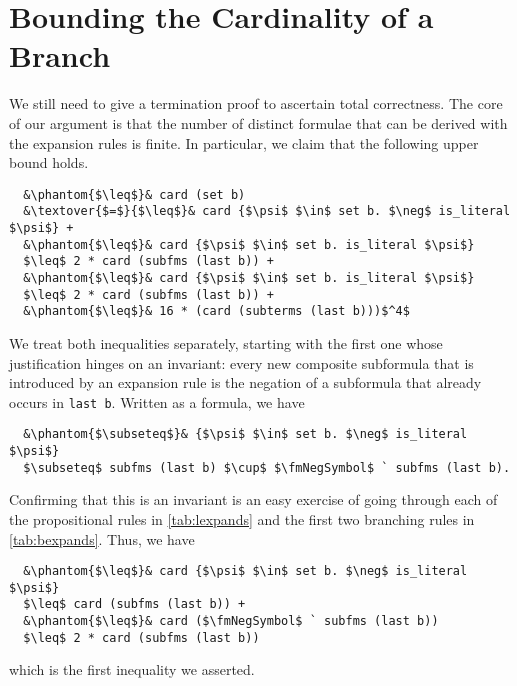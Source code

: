 \documentclass[sigplan,10pt,anonymous,review]{acmart}
\newcommand{\textover}[3][l]{%
 \makebox[\widthof{#3}][#1]{#2}%
}
\newcommand{\fmNegSymbol}{\boldsymbol{\neg}}
\begin{document}
\section{Bounding the Cardinality of a Branch\label{sec:bound}}
We still need to give a termination proof to ascertain total correctness.
The core of our argument is that the number of distinct formulae that can be derived with the expansion rules is finite.
In particular, we claim that the following upper bound holds.
\begin{lstlisting}
  &\phantom{$\leq$}& card (set b)
  &\textover{$=$}{$\leq$}& card {$\psi$ $\in$ set b. $\neg$ is_literal $\psi$} +
  &\phantom{$\leq$}& card {$\psi$ $\in$ set b. is_literal $\psi$}
  $\leq$ 2 * card (subfms (last b)) +
  &\phantom{$\leq$}& card {$\psi$ $\in$ set b. is_literal $\psi$}
  $\leq$ 2 * card (subfms (last b)) +
  &\phantom{$\leq$}& 16 * (card (subterms (last b)))$^4$
\end{lstlisting}
We treat both inequalities separately, starting with the first one whose justification hinges on an invariant: 
every new composite subformula that is introduced by an expansion rule is the negation of a subformula that already occurs in \lstinline!last b!.
Written as a formula, we have
\begin{lstlisting}
  &\phantom{$\subseteq$}& {$\psi$ $\in$ set b. $\neg$ is_literal $\psi$}
  $\subseteq$ subfms (last b) $\cup$ $\fmNegSymbol$ ` subfms (last b).
\end{lstlisting}
Confirming that this is an invariant is an easy exercise of going through each of the propositional rules in \autoref{tab:lexpands} and the first two branching rules in \autoref{tab:bexpands}.
Thus, we have
\begin{lstlisting}
  &\phantom{$\leq$}& card {$\psi$ $\in$ set b. $\neg$ is_literal $\psi$}
  $\leq$ card (subfms (last b)) +
  &\phantom{$\leq$}& card ($\fmNegSymbol$ ` subfms (last b))
  $\leq$ 2 * card (subfms (last b))
\end{lstlisting}
which is the first inequality we asserted. 
\end{document}
